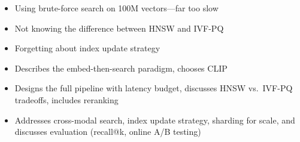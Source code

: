 \begin{interviewq}
\redflags
\begin{itemize}
    \item Using brute-force search on 100M vectors---far too slow
    \item Not knowing the difference between HNSW and IVF-PQ
    \item Forgetting about index update strategy
\end{itemize}


\goodgreat
\begin{itemize}
    \item {} Describes the embed-then-search paradigm, chooses CLIP
    \item {} Designs the full pipeline with latency budget, discusses HNSW vs.\ IVF-PQ tradeoffs, includes reranking
    \item {} Addresses cross-modal search, index update strategy, sharding for scale, and discusses evaluation (recall@k, online A/B testing)
\end{itemize}

\end{interviewq}

